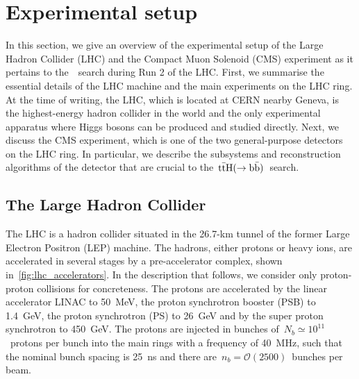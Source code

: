 \chapter{Experimental setup}
\label{sec:experiment}
In this section, we give an overview of the experimental setup of the Large Hadron Collider (LHC) and the Compact Muon Solenoid (CMS) experiment as it pertains to the~\ttH~search during Run 2 of the LHC. First, we summarise the essential details of the LHC machine and the main experiments on the LHC ring. At the time of writing, the LHC, which is located at CERN nearby Geneva, is the highest-energy hadron collider in the world and the only experimental apparatus where Higgs bosons can be produced and studied directly. Next, we discuss the CMS experiment, which is one of the two general-purpose detectors on the LHC ring. In particular, we describe the subsystems and reconstruction algorithms of the detector that are crucial to the~$\mathrm{t} \bar{\mathrm{t}} \mathrm{H} (\rightarrow \mathrm{b}\bar{\mathrm{b}})$~search.

\section{The Large Hadron Collider}
The LHC is a hadron collider situated in the 26.7-km tunnel of the former Large Electron Positron (LEP) machine. The hadrons, either protons or heavy ions, are accelerated in several stages by a pre-accelerator complex, shown in~\cref{fig:lhc_accelerators}. In the description that follows, we consider only proton-proton collisions for concreteness. The protons are accelerated by the linear accelerator LINAC to 50~MeV, the proton synchrotron booster (PSB) to 1.4~GeV, the proton synchrotron (PS) to 26~GeV and by the super proton synchrotron to 450~GeV. The protons are injected in bunches of~$N_b \simeq 10^{11}$~protons per bunch into the main rings with a frequency of 40~MHz, such that the nominal bunch spacing is 25~ns and there are~$n_b=\mathcal{O}(2500)$~bunches per beam.

